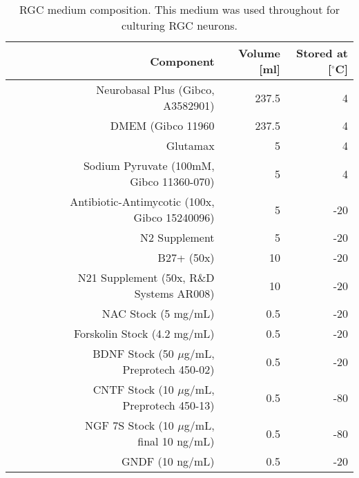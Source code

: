 \begin{table*}
    \begin{adjustbox}{max width=\textwidth,center}
        \begin{tabular}{@{}rrrrrrrr@{}}
            \toprule
            & & & & & Component & Volume [ml] & Stored at [$^{\circ}$C] \\
            \midrule
            & & & & & Neurobasal Plus (Gibco, A3582901)               & 237.5    &   4\\
            & & & & & DMEM (Gibco 11960                               & 237.5    &   4\\
            & & & & & Glutamax                                        & 5        &   4\\
            & & & & & Sodium Pyruvate (100mM, Gibco 11360-070)        & 5        &   4\\
            & & & & & Antibiotic-Antimycotic (100x, Gibco 15240096)   & 5        & -20\\
            & & & & & N2 Supplement                                   & 5        & -20\\
            & & & & & B27+ (50x)                                      & 10       & -20\\
            & & & & & N21 Supplement (50x, R$\&$D Systems AR008)      & 10       & -20\\
            & & & & & NAC Stock (5 mg/mL)                             & 0.5      & -20\\
            & & & & & Forskolin Stock (4.2 mg/mL)                     & 0.5      & -20\\
            & & & & & BDNF Stock (50 $\mu$g/mL, Preprotech 450-02)    & 0.5      & -20\\
            & & & & & CNTF Stock (10 $\mu$g/mL, Preprotech 450-13)    & 0.5      & -80\\
            & & & & & NGF 7S Stock (10 $\mu$g/mL, final 10 ng/mL)     & 0.5      & -80\\
            & & & & & GNDF (10 ng/mL)                                 & 0.5      & -20\\
            \bottomrule
        \end{tabular}
    \end{adjustbox}
    \caption[RGC medium composition]{RGC medium composition. This medium was
            used throughout for culturing RGC neurons.}
    \label{rgcmedium}
\end{table*}



